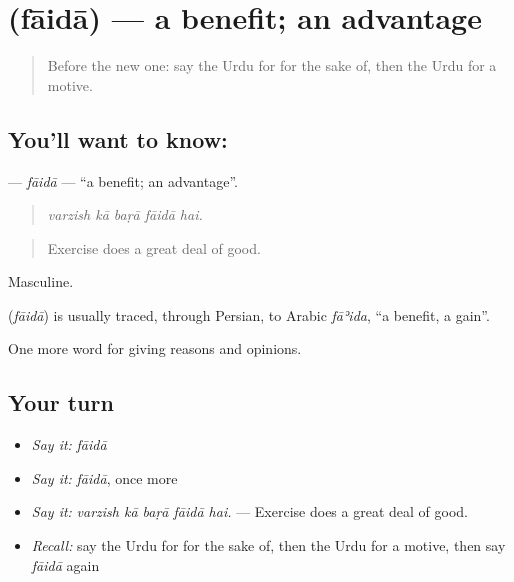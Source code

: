 \section[\texorpdfstring{\ur{فائدہ} (fāidā)}{فائدہ (fāidā)}]{ (fāidā) — a benefit; an advantage}

\label{lesson:UR-C333-faida}



\begin{quote}
Before the new one: say the Urdu for for the sake of, then the Urdu for a motive.
\end{quote}

\subsection*{You'll want to know: }
\textbf{} — \emph{fāidā} — \textquotedblleft{}a benefit; an advantage\textquotedblright{}.

\begin{quote}
    
\end{quote}

\begin{quote}
\emph{varzish kā baṛā fāidā hai.}
\end{quote}

\begin{quote}
Exercise does a great deal of good.
\end{quote}

Masculine.

\begin{cousinweb}
\textbf{} (\emph{fāidā}) is usually traced, through Persian, to Arabic \emph{fāʾida}, \textquotedblleft{}a benefit, a gain\textquotedblright{}.
\end{cousinweb}

\begin{grammarlens}[title={What you've built}]
One more word for giving reasons and opinions.
\end{grammarlens}

\subsection*{Your turn}
\begin{itemize}
\raggedright
  \item \emph{Say it:} \emph{fāidā}
  \item \emph{Say it:} \emph{fāidā}, once more
  \item \emph{Say it:} \emph{varzish kā baṛā fāidā hai.} — Exercise does a great deal of good.
  \item \emph{Recall:} say the Urdu for for the sake of, then the Urdu for a motive, then say \emph{fāidā} again
\end{itemize}

